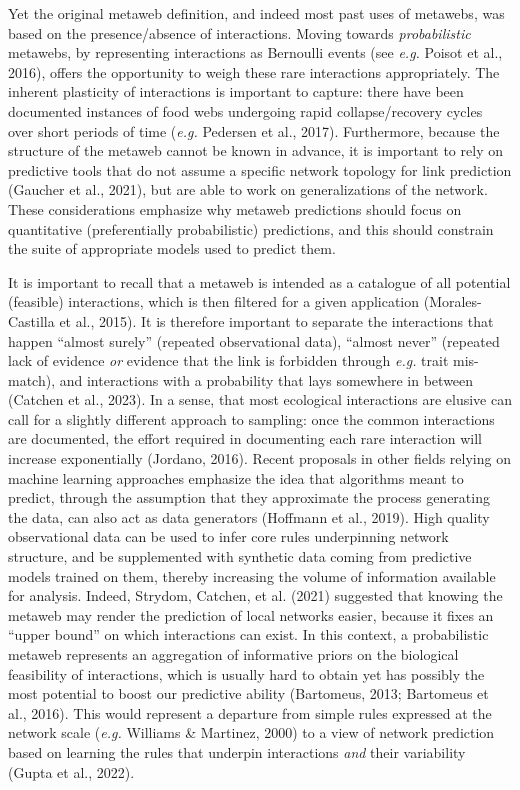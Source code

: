 \documentclass[10pt,oneside]{article}
\begin{document}
Yet the original metaweb definition, and indeed most past uses of
metawebs, was based on the presence/absence of interactions. Moving
towards \emph{probabilistic} metawebs, by representing interactions as
Bernoulli events (see \emph{e.g.} Poisot et al., 2016), offers the
opportunity to weigh these rare interactions appropriately. The inherent
plasticity of interactions is important to capture: there have been
documented instances of food webs undergoing rapid collapse/recovery
cycles over short periods of time (\emph{e.g.} Pedersen et al., 2017).
Furthermore, because the structure of the metaweb cannot be known in
advance, it is important to rely on predictive tools that do not assume
a specific network topology for link prediction (Gaucher et al., 2021),
but are able to work on generalizations of the network. These
considerations emphasize why metaweb predictions should focus on
quantitative (preferentially probabilistic) predictions, and this should
constrain the suite of appropriate models used to predict them.

It is important to recall that a metaweb is intended as a catalogue of
all potential (feasible) interactions, which is then filtered for a
given application (Morales-Castilla et al., 2015). It is therefore
important to separate the interactions that happen ``almost surely''
(repeated observational data), ``almost never'' (repeated lack of
evidence \emph{or} evidence that the link is forbidden through
\emph{e.g.} trait mis-match), and interactions with a probability that
lays somewhere in between (Catchen et al., 2023). In a sense, that most
ecological interactions are elusive can call for a slightly different
approach to sampling: once the common interactions are documented, the
effort required in documenting each rare interaction will increase
exponentially (Jordano, 2016). Recent proposals in other fields relying
on machine learning approaches emphasize the idea that algorithms meant
to predict, through the assumption that they approximate the process
generating the data, can also act as data generators (Hoffmann et al.,
2019). High quality observational data can be used to infer core rules
underpinning network structure, and be supplemented with synthetic data
coming from predictive models trained on them, thereby increasing the
volume of information available for analysis. Indeed, Strydom, Catchen,
et al. (2021) suggested that knowing the metaweb may render the
prediction of local networks easier, because it fixes an ``upper bound''
on which interactions can exist. In this context, a probabilistic
metaweb represents an aggregation of informative priors on the
biological feasibility of interactions, which is usually hard to obtain
yet has possibly the most potential to boost our predictive ability
(Bartomeus, 2013; Bartomeus et al., 2016). This would represent a
departure from simple rules expressed at the network scale (\emph{e.g.}
Williams \& Martinez, 2000) to a view of network prediction based on
learning the rules that underpin interactions \emph{and} their
variability (Gupta et al., 2022).
\end{document}
